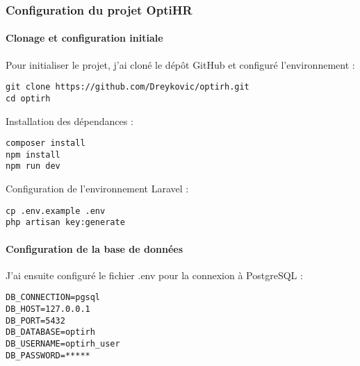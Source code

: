 \subsubsection{Configuration du projet OptiHR}

\paragraph{Clonage et configuration initiale}
Pour initialiser le projet, j'ai cloné le dépôt GitHub et configuré l'environnement :

\begin{tcolorbox}[colback=black, coltext=white, title=Clonage du projet, fonttitle=\bfseries]
\texttt{git clone https://github.com/Dreykovic/optirh.git} \\
\texttt{cd optirh}
\end{tcolorbox}

Installation des dépendances :

\begin{tcolorbox}[colback=black, coltext=white, title=Installation des dépendances, fonttitle=\bfseries]
\texttt{composer install} \\
\texttt{npm install} \\
\texttt{npm run dev}
\end{tcolorbox}

Configuration de l'environnement Laravel :

\begin{tcolorbox}[colback=black, coltext=white, title=Configuration de l'environnement, fonttitle=\bfseries]
\texttt{cp .env.example .env} \\
\texttt{php artisan key:generate}
\end{tcolorbox}

\paragraph{Configuration de la base de données}
J'ai ensuite configuré le fichier .env pour la connexion à PostgreSQL :

\begin{tcolorbox}[colback=black, coltext=white, title=Configuration de la connexion DB, fonttitle=\bfseries]
\texttt{DB\_CONNECTION=pgsql} \\
\texttt{DB\_HOST=127.0.0.1} \\
\texttt{DB\_PORT=5432} \\
\texttt{DB\_DATABASE=optirh} \\
\texttt{DB\_USERNAME=optirh\_user} \\
\texttt{DB\_PASSWORD=*****}
\end{tcolorbox}

